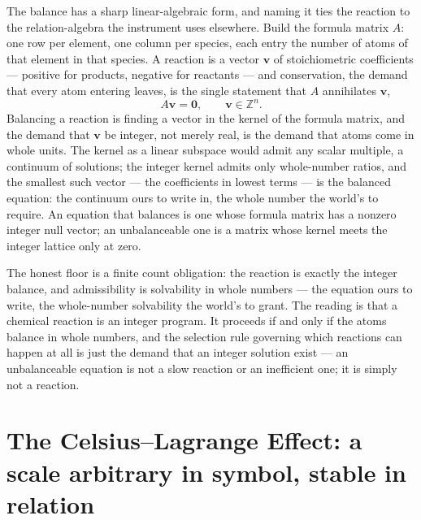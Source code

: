 The balance has a sharp linear-algebraic form, and naming it ties the reaction to the relation-algebra the
instrument uses elsewhere. Build the formula matrix $A$: one row per element, one column per species, each entry the
number of atoms of that element in that species. A reaction is a vector $\mathbf{v}$ of stoichiometric
coefficients --- positive for products, negative for reactants --- and conservation, the demand that every
atom entering leaves, is the single statement that $A$ annihilates $\mathbf{v}$,
\begin{equation}
  A\mathbf{v} = \mathbf{0}, \qquad \mathbf{v} \in \mathbb{Z}^n .
\end{equation}
Balancing a reaction is finding a vector in the kernel of the formula matrix, and the demand that $\mathbf{v}$
be integer, not merely real, is the demand that atoms come in whole units. The kernel as a linear subspace
would admit any scalar multiple, a continuum of solutions; the integer kernel admits only whole-number ratios,
and the smallest such vector --- the coefficients in lowest terms --- is the balanced equation: the continuum
ours to write in, the whole number the world's to require. An equation
that balances is one whose formula matrix has a nonzero integer null vector; an unbalanceable one is a matrix
whose kernel meets the integer lattice only at zero.

The honest floor is a finite count obligation: the reaction is exactly the integer balance, and admissibility
is solvability in whole numbers --- the equation ours to write, the whole-number solvability the world's to
grant. The reading is that a chemical reaction is an integer program. It proceeds if
and only if the atoms balance in whole numbers, and the selection rule governing which reactions can happen at
all is just the demand that an integer solution exist --- an unbalanceable equation is not a slow reaction or
an inefficient one; it is simply not a reaction.

\section{The Celsius--Lagrange Effect: a scale arbitrary in symbol, stable in relation}
\label{se:celsius-lagrange}

